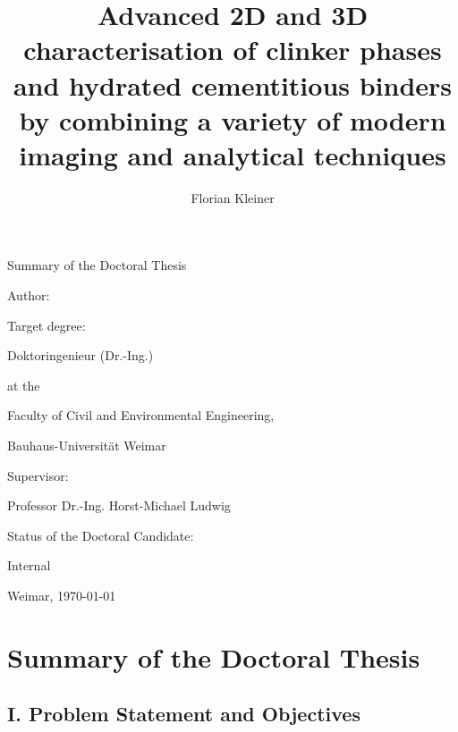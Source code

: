 \documentclass[11pt, a4paper]{article}
\title{Advanced 2D and 3D characterisation of clinker phases and hydrated cementitious binders by combining a variety of modern imaging and analytical techniques}
\author{Florian Kleiner}
\begin{document}
\begin{titlepage}
    \centering
    \vspace*{1cm}
    
    {\Large Summary of the Doctoral Thesis\par}
    \vspace{1.5cm}
    
    {\LARGE \textbf{\thetitle}\par}
    \vspace{2cm}
    
    {\large Author:\par}
    {\Large \theauthor\par}
    \vspace{1cm}
    
    {\large Target degree:\par}
    {\Large Doktoringenieur (Dr.-Ing.)\par}
    \vspace{1cm}
    
    { at the\par}
    {\large Faculty of Civil and Environmental Engineering,\par}
    {\large Bauhaus-Universität Weimar\par}
    \vspace{1cm}

    {\large Supervisor:\par}
    {\Large Professor Dr.-Ing. Horst-Michael Ludwig\par}
    \vspace{1cm}
    
    {\large Status of the Doctoral Candidate:\par}
    {\Large Internal\par}
    \vspace{3cm}
    
    \vfill
    
    {\large Weimar, \today\par}
\end{titlepage}

\newpage

\section*{Summary of the Doctoral Thesis}

\subsection*{I. Problem Statement and Objectives}
\end{document}
